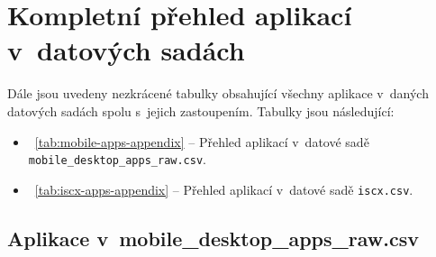 \section{Kompletní přehled aplikací v~datových sadách}
Dále jsou uvedeny nezkrácené tabulky obsahující všechny aplikace v~daných datových sadách spolu s~jejich zastoupením.
Tabulky jsou následující:
\begin{itemize}
	\item~\ref{tab:mobile-apps-appendix} --  Přehled aplikací v~datové sadě \texttt{mobile\_desktop\_apps\_raw.csv}.
    
	\item~\ref{tab:iscx-apps-appendix} --  Přehled aplikací v~datové sadě \texttt{iscx.csv}.
\end{itemize}
\newpage
\subsection{Aplikace v~mobile\_desktop\_apps\_raw.csv}
